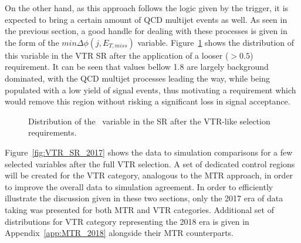 \hspace{10pt} On the other hand, as this approach follows the logic given by the trigger, it is expected to bring a certain amount of QCD multijet events as well. As seen in the previous section, a good handle for dealing with these processes is given in the form of the $min\Delta\phi(j, E_{T,miss})$ variable. Figure~\ref{fig:VTR_mindphi} shows the distribution of this variable in the VTR SR after the application of a looser ($>0.5$) requirement. It can be seen that values bellow 1.8 are largely background dominated, with the QCD multijet processes leading the way, while being populated with a low yield of signal events, thus motivating a requirement which would remove this region without risking a significant loss in signal acceptance. 

\begin{figure}[htbp]
  \centering
  \caption{Distribution of the \mindphi~variable in the SR after the VTR-like selection requirements.}
  \label{fig:VTR_mindphi}
\end{figure}
Figure~\ref{fig:VTR_SR_2017} shows the data to simulation comparisons for a few selected variables after the full VTR selection. A set of dedicated control regions will be created for the VTR category, analogous to the MTR approach, in order to improve the overall data to simulation agreement. In order to efficiently illustrate the discussion given in these two sections, only the 2017 era of data taking was presented for both MTR and VTR categories. Additional set of distributions for VTR category representing the 2018 era is given in Appendix~\ref{app:MTR_2018} alongside their MTR counterparts. 


